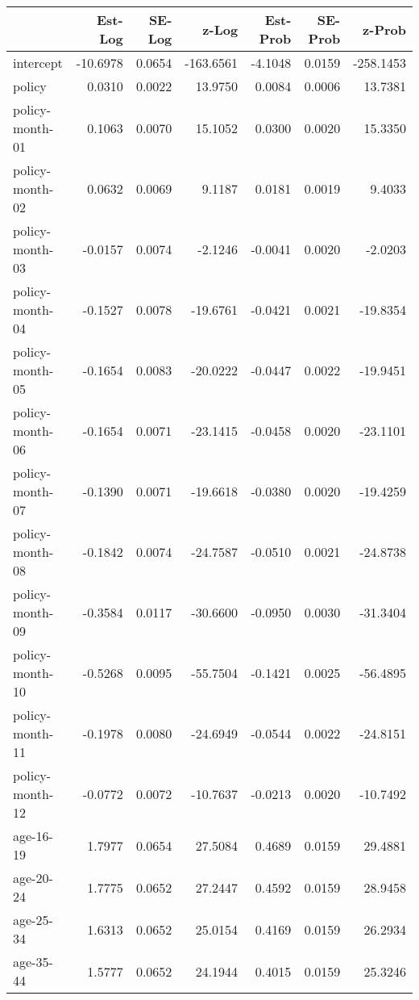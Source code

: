 \documentclass[10pt]{article}
\begin{document}
\clearpage
\pagebreak




\begin{table}[ht]
\centering
\begin{tabular}{lrrrrrr}
  \hline
 & Est-Log & SE-Log & z-Log & Est-Prob & SE-Prob & z-Prob \\ 
  \hline
intercept & -10.6978 & 0.0654 & -163.6561 & -4.1048 & 0.0159 & -258.1453 \\ 
  policy & 0.0310 & 0.0022 & 13.9750 & 0.0084 & 0.0006 & 13.7381 \\ 
  policy-month-01 & 0.1063 & 0.0070 & 15.1052 & 0.0300 & 0.0020 & 15.3350 \\ 
  policy-month-02 & 0.0632 & 0.0069 & 9.1187 & 0.0181 & 0.0019 & 9.4033 \\ 
  policy-month-03 & -0.0157 & 0.0074 & -2.1246 & -0.0041 & 0.0020 & -2.0203 \\ 
  policy-month-04 & -0.1527 & 0.0078 & -19.6761 & -0.0421 & 0.0021 & -19.8354 \\ 
  policy-month-05 & -0.1654 & 0.0083 & -20.0222 & -0.0447 & 0.0022 & -19.9451 \\ 
  policy-month-06 & -0.1654 & 0.0071 & -23.1415 & -0.0458 & 0.0020 & -23.1101 \\ 
  policy-month-07 & -0.1390 & 0.0071 & -19.6618 & -0.0380 & 0.0020 & -19.4259 \\ 
  policy-month-08 & -0.1842 & 0.0074 & -24.7587 & -0.0510 & 0.0021 & -24.8738 \\ 
  policy-month-09 & -0.3584 & 0.0117 & -30.6600 & -0.0950 & 0.0030 & -31.3404 \\ 
  policy-month-10 & -0.5268 & 0.0095 & -55.7504 & -0.1421 & 0.0025 & -56.4895 \\ 
  policy-month-11 & -0.1978 & 0.0080 & -24.6949 & -0.0544 & 0.0022 & -24.8151 \\ 
  policy-month-12 & -0.0772 & 0.0072 & -10.7637 & -0.0213 & 0.0020 & -10.7492 \\ 
  age-16-19 & 1.7977 & 0.0654 & 27.5084 & 0.4689 & 0.0159 & 29.4881 \\ 
  age-20-24 & 1.7775 & 0.0652 & 27.2447 & 0.4592 & 0.0159 & 28.9458 \\ 
  age-25-34 & 1.6313 & 0.0652 & 25.0154 & 0.4169 & 0.0159 & 26.2934 \\ 
  age-35-44 & 1.5777 & 0.0652 & 24.1944 & 0.4015 & 0.0159 & 25.3246 \\ 

\end{tabular}
\end{table}
\end{document}
